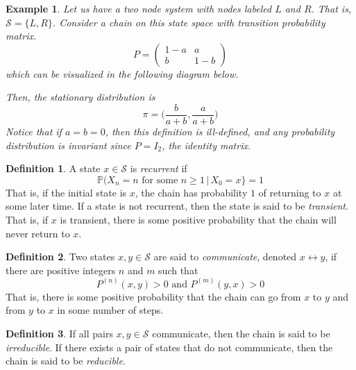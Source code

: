 \documentclass{article}
\newtheorem{example}{Example}[section]
\theoremstyle{remark}
\theoremstyle{definition}
\newtheorem{definition}{Definition}[section]
\begin{document}
\begin{example}
Let us have a two node system with nodes labeled $L$ and $R$. That is, $\mathcal{S} = \{L, R\}$. Consider a chain on this state space with transition probability matrix. 
\[P = \begin{pmatrix}
1-a & a \\ b & 1-b 
\end{pmatrix}\]
which can be visualized in the following diagram below.
\begin{center}
\end{center}

Then, the stationary distribution is 
\[\pi = \Big( \frac{b}{a+b}, \frac{a}{a+b} \Big)\]
Notice that if $a = b = 0$, then this definition is ill-defined, and any probability distribution is invariant since $P = I_2$, the identity matrix. 
\end{example}

\begin{definition}
A state $x \in \mathcal{S}$ is \textit{recurrent} if
\[\mathbb{P}(X_n = n \text{ for some } n \geq 1 \, | \, X_0 = x\} = 1\]
That is, if the initial state is $x$, the chain has probability $1$ of returning to $x$ at some later time. If a state is not recurrent, then the state is said to be \textit{transient}. That is, if $x$ is transient, there is some positive probability that the chain will never return to $x$. 
\end{definition}

\begin{definition}
Two states $x, y \in \mathcal{S}$ are said to \textit{communicate}, denoted $x \leftrightarrow y$, if there are positive integers $n$ and $m$ such that 
\[P^{(n)} (x, y) > 0 \text{ and } P^{(m)} (y, x) > 0\]
That is, there is some positive probability that the chain can go from $x$ to $y$ and from $y$ to $x$ in some number of steps. 
\end{definition}

\begin{definition}
If all pairs $x, y \in \mathcal{S}$ communicate, then the chain is said to be \textit{irreducible}. If there exists a pair of states that do not communicate, then the chain is said to be \textit{reducible}. 
\end{definition}
\end{document}
